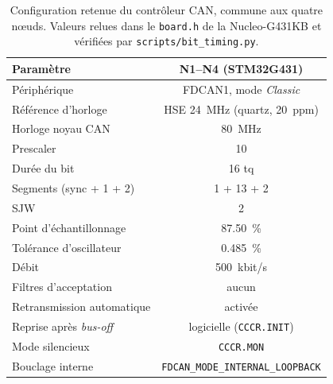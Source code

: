 
\begin{table}[H]
\centering\small
\begin{tabular}{lc}
\toprule
\textbf{Paramètre} & \textbf{N1--N4 (STM32G431)} \\
\midrule
Périphérique & FDCAN1, mode \emph{Classic} \\
Référence d'horloge & HSE \SI{24}{MHz} (quartz, \SI{20}{ppm}) \\
Horloge noyau CAN & \SI{80}{MHz} \\
Prescaler & 10 \\
Durée du bit & 16 tq \\
Segments (sync + 1 + 2) & 1 + 13 + 2 \\
SJW & 2 \\
Point d'échantillonnage & \SI{87.50}{\percent} \\
Tolérance d'oscillateur & \SI{0.485}{\percent} \\
Débit & \SI{500}{kbit/s} \\
\midrule
Filtres d'acceptation & aucun \\
Retransmission automatique & activée \\
Reprise après \emph{bus-off} & logicielle (\texttt{CCCR.INIT}) \\
Mode silencieux & \texttt{CCCR.MON} \\
Bouclage interne & \texttt{FDCAN\_MODE\_INTERNAL\_LOOPBACK} \\
\bottomrule
\end{tabular}
\caption{Configuration retenue du contrôleur CAN, commune aux quatre nœuds. Valeurs relues dans le \texttt{board.h} de la Nucleo-G431KB et vérifiées par \texttt{scripts/bit\_timing.py}.}
\label{tab:config-logicielle}
\end{table}
